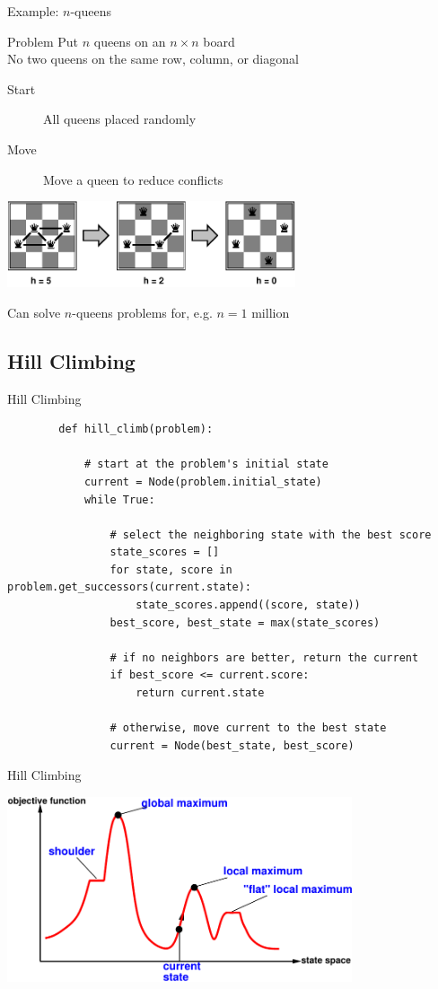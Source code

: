 \documentclass[14pt]{beamer}
\begin{document}
\begin{frame}{Example: $n$-queens}
	\begin{block}{Problem}
		Put $n$ queens on an $n \times n$ board \\
		No two queens	on the same row, column, or diagonal
	\end{block}
	\begin{description}
		\item[Start] All queens placed randomly
		\item[Move] Move a queen to reduce conflicts
	\end{description}
	\begin{center}
		\includegraphics[height=1in]{4-queens-iterative.pdf}
	\end{center}
	Can solve $n$-queens problems for, e.g. $n = 1$ million
\end{frame}

\subsection{Hill Climbing}
\begin{frame}[fragile]{Hill Climbing}
	\scriptsize
	\begin{lstlisting}
		def hill_climb(problem):
		
		    # start at the problem's initial state
		    current = Node(problem.initial_state)
		    while True:
		
		        # select the neighboring state with the best score
		        state_scores = []
		        for state, score in problem.get_successors(current.state):
		            state_scores.append((score, state))
		        best_score, best_state = max(state_scores)
		
		        # if no neighbors are better, return the current
		        if best_score <= current.score:
		            return current.state
		
		        # otherwise, move current to the best state
		        current = Node(best_state, best_score)
	\end{lstlisting}
\end{frame}
\begin{frame}{Hill Climbing}
	\begin{center}
		\includegraphics[width=4in]{hill-climbing.pdf}
	\end{center}
\end{frame}
\end{document}
